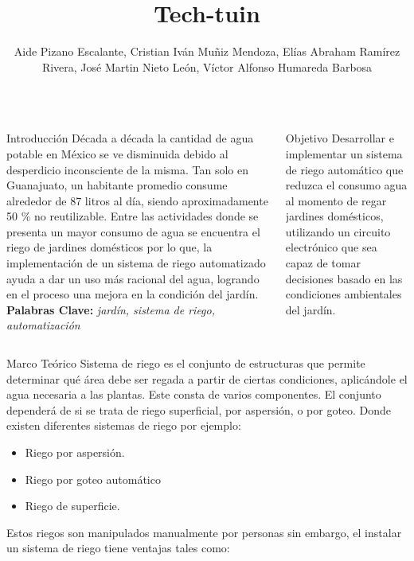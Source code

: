 \documentclass{beamer}
\title{Tech-tuin}
\author{Aide Pizano Escalante, Cristian Iván Muñiz Mendoza, Elías Abraham Ramírez Rivera, José Martin Nieto León, Víctor Alfonso Humareda Barbosa}
\institute{Ingeniería en Telemática}
\date{}
\begin{document}
\begin{frame}[fragile]{} 
\begin{columns}[t]
  \begin{column}{0.46\textwidth}
    \begin{block}{Introducción}\justifying
      Década a década la cantidad de agua potable en México se ve disminuida debido al desperdicio inconsciente de la misma. Tan solo en Guanajuato, un habitante promedio consume alrededor de 87 litros al día, siendo aproximadamente 50 \% no reutilizable. Entre las actividades donde se presenta un mayor consumo de agua se encuentra el riego de jardines domésticos por lo que, la implementación de un sistema de riego automatizado ayuda a dar un uso más racional del agua, logrando en el proceso una mejora en la condición del jardín.\\
      \textbf{Palabras Clave:} \textit{ jardín, sistema de riego, automatización}
     \end{block}
  \end{column}
  \begin{column}{0.46\textwidth}
    \begin{block}{Objetivo}\justifying
        Desarrollar e implementar un sistema de riego automático que reduzca el consumo
agua al momento de regar jardines domésticos, utilizando un circuito electrónico que sea
capaz de tomar decisiones basado en las condiciones ambientales del jardín. \\

    \end{block}
  \end{column}
\end{columns}


\justifying
\begin{columns}[t]
 \begin{column}{0.96\textwidth}
     \begin{block}{Marco Teórico}
           \vspace{0pt}
 Sistema de riego es el conjunto de estructuras que permite determinar qué área debe ser regada a partir de ciertas condiciones, aplicándole el agua necesaria a las plantas. Este consta de varios componentes. El conjunto dependerá de si se trata de riego superficial, por aspersión, o por goteo. Donde existen diferentes sistemas de riego por ejemplo:
\begin{itemize}
\item  Riego por aspersión.
\item  Riego por goteo automático
\item  Riego de superficie.
\end{itemize}
Estos riegos son manipulados manualmente por personas sin embargo, el instalar un sistema de riego tiene ventajas tales como:


\end{block}
\end{column}
\end{columns}
\end{frame}
\end{document}
